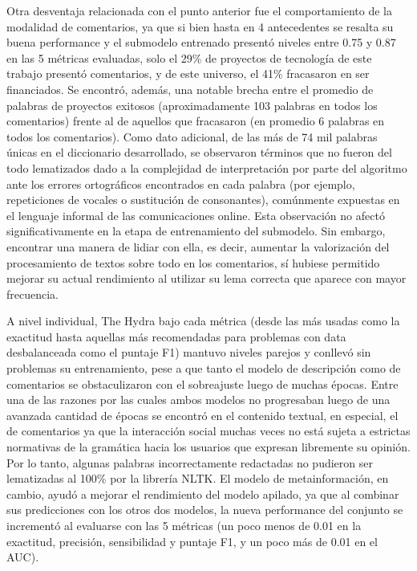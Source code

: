 Otra desventaja relacionada con el punto anterior fue el comportamiento de la modalidad de comentarios, ya que si bien hasta en 4 antecedentes se resalta su buena performance y el submodelo entrenado presentó niveles entre 0.75 y 0.87 en las 5 métricas evaluadas, solo el 29\% de proyectos de tecnología de este trabajo presentó comentarios, y de este universo, el 41\% fracasaron en ser financiados. Se encontró, además, una notable brecha entre el promedio de palabras de proyectos exitosos (aproximadamente 103 palabras en todos los comentarios) frente al de aquellos que fracasaron (en promedio 6 palabras en todos los comentarios). Como dato adicional, de las más de 74 mil palabras únicas en el diccionario desarrollado, se observaron términos que no fueron del todo lematizados dado a la complejidad de interpretación por parte del algoritmo ante los errores ortográficos encontrados en cada palabra (por ejemplo, repeticiones de vocales o sustitución de consonantes), comúnmente expuestas en el lenguaje informal de las comunicaciones online. Esta observación no afectó significativamente en la etapa de entrenamiento del submodelo. Sin embargo, encontrar una manera de lidiar con ella, es decir, aumentar la valorización del procesamiento de textos sobre todo en los comentarios, sí hubiese permitido mejorar su actual rendimiento al utilizar su lema correcta que aparece con mayor frecuencia.

A nivel individual, The Hydra bajo cada métrica (desde las más usadas como la exactitud hasta aquellas más recomendadas para problemas con data desbalanceada como el puntaje F1) mantuvo niveles parejos y conllevó sin problemas su entrenamiento, pese a que tanto el modelo de descripción como de comentarios se obstaculizaron con el sobreajuste luego de muchas épocas. Entre una de las razones por las cuales ambos modelos no progresaban luego de una avanzada cantidad de épocas se encontró en el contenido textual, en especial, el de comentarios ya que la interacción social muchas veces no está sujeta a estrictas normativas de la gramática hacia los usuarios que expresan libremente su opinión. Por lo tanto, algunas palabras incorrectamente redactadas no pudieron ser lematizadas al 100\% por la librería NLTK. El modelo de metainformación, en cambio, ayudó a mejorar el rendimiento del modelo apilado, ya que al combinar sus predicciones con los otros dos modelos, la nueva performance del conjunto se incrementó al evaluarse con las 5 métricas (un poco menos de 0.01 en la exactitud, precisión, sensibilidad y puntaje F1, y un poco más de 0.01 en el AUC).

